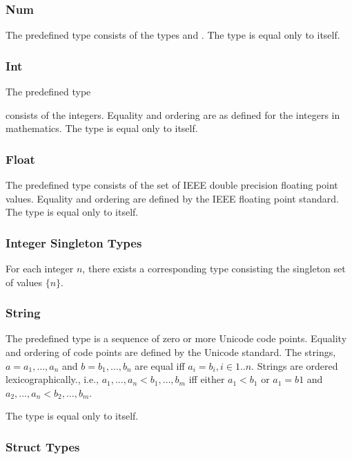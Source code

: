 \documentclass{article}
\begin{document}
{\subsubsection{Num}
\label{number}

 The predefined type \NUM{} consists of the types \INT{} and \FLOAT. The type \NUM{} is equal only to itself. 
 
\subsubsection{Int}
\label{int}

The predefined type \INT} consists of the integers. Equality and ordering are as defined for the integers in mathematics. The type \INT{} is equal only to itself.


\subsubsection{Float}
\label{float}

The predefined type \FLOAT{} consists of the set of IEEE double precision floating point values.  Equality and ordering are defined by the IEEE floating point standard.  The type \FLOAT{} is equal only to itself.
 
\subsubsection{Integer Singleton Types}
\label{integerSingletonTypes}

For each integer $n$, there exists a corresponding type consisting the singleton set of values $\{n\}$. 


\subsubsection{String}
\label{string}

The predefined type \STRING{} is a sequence of zero or more Unicode code points. Equality and ordering of code points are defined by the Unicode standard. 
The strings, $a = a_1, \ldots, a_n$ and $b = b_1, \ldots, b_n$ are equal iff $a_i = b_i, i \in 1..n$. Strings are ordered lexicographically., i.e., $a_1, \ldots, a_n < b_1, \ldots, b_m$ iff  either $a_1 < b_1$ or $a_1 = b1$ and $a_2, \ldots, a_n < b_2, \ldots, b_m$.

The type \STRING{} is equal only to itself. 

\subsubsection{Struct Types}
\label{structTypes}
\end{document}

